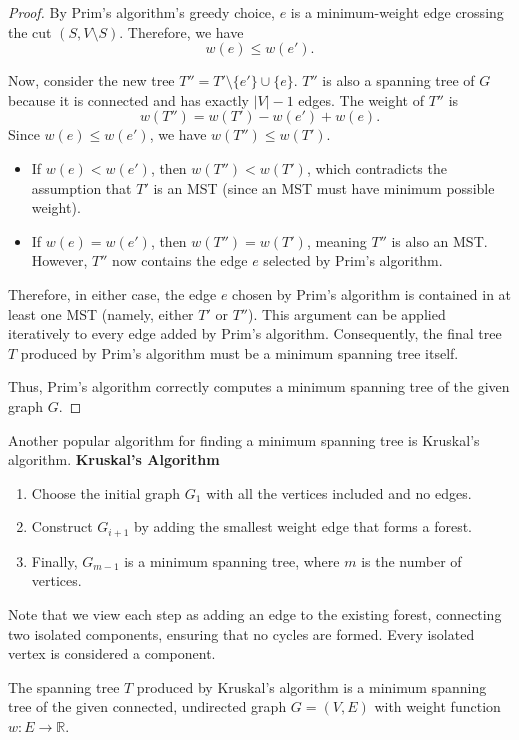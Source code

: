 \begin{proof}
By Prim's algorithm's greedy choice, $e$ is a minimum-weight edge crossing the cut $(S, V \setminus S)$. Therefore, we have
\[
w(e) \leq w(e').
\]

Now, consider the new tree $T'' = T' \setminus \{e'\} \cup \{e\}$. $T''$ is also a spanning tree of $G$ because it is connected and has exactly $|V|-1$ edges. The weight of $T''$ is
\[
w(T'') = w(T') - w(e') + w(e).
\]
Since $w(e) \leq w(e')$, we have $w(T'') \leq w(T')$.

\begin{itemize}
    \item If $w(e) < w(e')$, then $w(T'') < w(T')$, which contradicts the assumption that $T'$ is an MST (since an MST must have minimum possible weight).
    \item If $w(e) = w(e')$, then $w(T'') = w(T')$, meaning $T''$ is also an MST. However, $T''$ now contains the edge $e$ selected by Prim's algorithm.
\end{itemize}

Therefore, in either case, the edge $e$ chosen by Prim's algorithm is contained in at least one MST (namely, either $T'$ or $T''$). This argument can be applied iteratively to every edge added by Prim's algorithm. Consequently, the final tree $T$ produced by Prim's algorithm must be a minimum spanning tree itself.

Thus, Prim's algorithm correctly computes a minimum spanning tree of the given graph $G$.

\end{proof}

Another popular algorithm for finding a minimum spanning tree is Kruskal's algorithm.
\textbf{Kruskal's Algorithm}
\begin{enumerate}
    \item Choose the initial graph $G_1$ with all the vertices included and no edges.
    \item Construct $G_{i+1}$ by adding the smallest weight edge that forms a forest.
    \item Finally, $G_{m-1}$ is a minimum spanning tree, where $m$ is the number of vertices.
\end{enumerate}

Note that we view each step as adding an edge to the existing forest, connecting two isolated components, ensuring that no cycles are formed. Every isolated vertex is considered a component.

\begin{theorem}
The spanning tree $T$ produced by Kruskal's algorithm is a minimum spanning tree of the given connected, undirected graph $G=(V,E)$ with weight function $w:E\to\mathbb{R}$.
\end{theorem}

